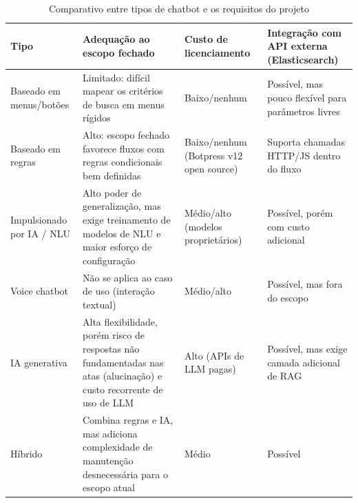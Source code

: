 \begin{table}[H]
  \centering
  \caption{Comparativo entre tipos de chatbot e os requisitos do projeto}
  \label{tab:comparativo-chatbots}
  \begin{tabular}{p{3.0cm}p{4.3cm}p{2.0cm}p{3.5cm}}
    \hline
    \textbf{Tipo} & \textbf{Adequação ao escopo fechado} & \textbf{Custo de licenciamento} & \textbf{Integração com API externa (Elasticsearch)} \\
    \hline
    Baseado em menus/botões & Limitado: difícil mapear os critérios de busca em menus rígidos & Baixo/nenhum & Possível, mas pouco flexível para parâmetros livres \\
    Baseado em regras & Alto: escopo fechado favorece fluxos com regras condicionais bem definidas & Baixo/nenhum (Botpress v12 open source) & Suporta chamadas HTTP/JS dentro do fluxo \\
    Impulsionado por IA / NLU & Alto poder de generalização, mas exige treinamento de modelos de NLU e maior esforço de configuração & Médio/alto (modelos proprietários) & Possível, porém com custo adicional \\
    Voice chatbot & Não se aplica ao caso de uso (interação textual) & Médio/alto & Possível, mas fora do escopo \\
    IA generativa & Alta flexibilidade, porém risco de respostas não fundamentadas nas atas (alucinação) e custo recorrente de uso de LLM & Alto (APIs de LLM pagas) & Possível, mas exige camada adicional de RAG \\
    Híbrido & Combina regras e IA, mas adiciona complexidade de manutenção desnecessária para o escopo atual & Médio & Possível \\
    \hline
  \end{tabular}
\end{table}

